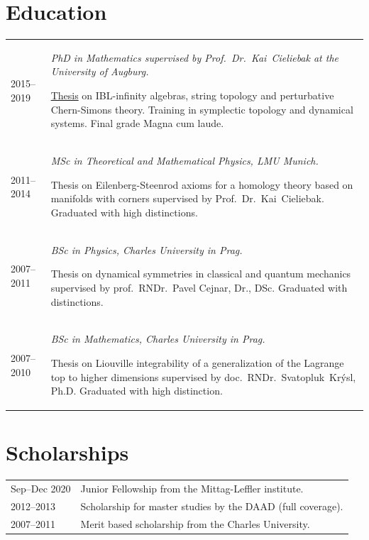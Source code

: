 \documentclass[a4paper,12pt]{article}
\begin{document}
\section*{Education}
%
\begin{tabularx}{\textwidth}{@{}lX@{}}
	2015--2019 & \emph{PhD in Mathematics supervised by Prof.~Dr.~Kai~Cieliebak at the University of Augburg.}
	
			\href{https://opus.bibliothek.uni-augsburg.de/opus4/72493}{Thesis} on IBL-infinity algebras, string topology and perturbative Chern-Simons theory.
			Training in symplectic topology and dynamical systems.
			Final grade Magna cum laude.\\
	2011--2014 & \emph{MSc in Theoretical and Mathematical Physics, LMU Munich.}
		
			Thesis on Eilenberg-Steenrod axioms for a homology theory based on manifolds with corners supervised by Prof.~Dr.~Kai~Cieliebak.
			Graduated with high distinctions.\\
	2007--2011 & \emph{BSc in Physics, Charles University in Prag.}

			Thesis on dynamical symmetries in classical and quantum mechanics supervised by prof.~RNDr.~Pavel Cejnar, Dr., DSc.
			Graduated with distinctions.\\
	2007--2010 &  \emph{BSc in Mathematics, Charles University in Prag.}

			Thesis on Liouville integrability of a generalization of the Lagrange top to higher dimensions supervised by doc.~RNDr.~Svatopluk~Kr\'ysl, Ph.D.
			Graduated with high distinction. 
\end{tabularx}
%
\section*{Scholarships}
%
\begin{tabularx}{\textwidth}{@{}lX@{}}
	Sep--Dec 2020	& 	Junior Fellowship from the Mittag-Leffler institute.\\
	2012--2013 	& 	Scholarship for master studies by the DAAD (full coverage). \\
	2007--2011 	& 	Merit based scholarship from the Charles University.
\end{tabularx}
%
%
%
\end{document}
